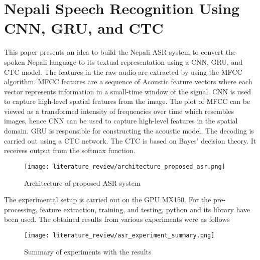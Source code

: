 \section{Nepali Speech Recognition Using CNN, GRU, and CTC}
This paper presents an idea to build the Nepali ASR system to convert the spoken Nepali language to its textual representation using a CNN, GRU, and CTC model. The features in the raw audio are extracted by using the MFCC algorithm. MFCC features are a sequence of Acoustic feature vectors where each vector represents information in a small-time window of the signal. CNN is used to capture high-level spatial features from the image. The plot of MFCC can be viewed as a transformed intensity of frequencies over time which resembles images, hence CNN can be used to capture high-level features in the spatial domain. GRU is responsible for constructing the acoustic model. The decoding is carried out using a CTC network. The CTC is based on Bayes’ decision theory. It receives output from the softmax function. 


\begin{figure}[H]
    \centering
    \texttt{[image: literature\_review/architecture\_proposed\_asr.png]}
    \caption{Architecture of proposed ASR system}
    \label{fig:Architecture of proposed ASR system}
\end{figure}

The experimental setup is carried out on the GPU MX150. For the pre-processing, feature extraction, training, and testing, python and its library have been used. The obtained results from various experiments were as follows

\begin{figure}[H]
    \centering
    \texttt{[image: literature\_review/asr\_experiment\_summary.png]}
    \caption{Summary of experiments with the results}
    \label{fig:Summary of experiments with the results}
\end{figure}

